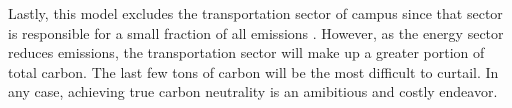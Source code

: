 Lastly, this model excludes the transportation sector of campus since that sector is responsible for a small fraction of all emissions \cite{institute_for_sustainability_energy_and_environment_illinois_2020}. However, as the energy sector reduces emissions, the transportation sector will make up a greater portion of total carbon. The last few tons of carbon will be the most difficult to curtail. In any case, achieving true carbon neutrality is an amibitious and costly endeavor.